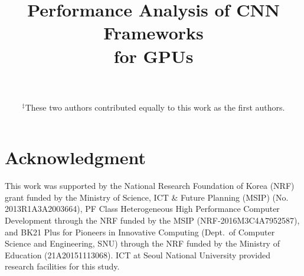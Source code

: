 \documentclass[conference]{IEEEtran}
\begin{document}
\title{Performance Analysis of CNN Frameworks\\
 for GPUs}

\author{%
  \\
  \\
  $^{\ddagger}$These two authors contributed equally to this work as the first authors.
}

\maketitle

\begin{abstract}

\end{abstract}

\IEEEpeerreviewmaketitle

\renewcommand{\baselinestretch}{.95} 









\section*{Acknowledgment}

This work was supported by the National Research Foundation of Korea (NRF) grant funded by the Ministry of Science, ICT \& Future Planning (MSIP) (No. 2013R1A3A2003664), PF Class Heterogeneous High Performance Computer Development through the NRF funded by the MSIP (NRF-2016M3C4A7952587), and BK21 Plus for Pioneers in Innovative Computing (Dept.\ of Computer Science and Engineering, SNU) through the NRF funded by the Ministry of Education (21A20151113068). ICT at Seoul National University provided research facilities for this study.



\end{document}
